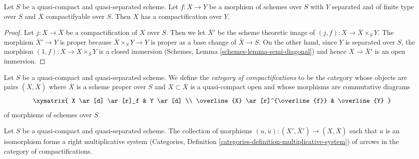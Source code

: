 \begin{lemma}
\label{lemma-compactifyable}
Let $S$ be a quasi-compact and quasi-separated scheme. Let $f : X \to Y$
be a morphism of schemes over $S$ with $Y$ separated and of finite type
over $S$ and $X$ compactifyable over $S$. Then $X$ has a compactification
over $Y$.
\end{lemma}

\begin{proof}
Let $j : X \to \overline{X}$ be a compactification of $X$ over $S$.
Then we let $\overline{X}'$ be
the scheme theoretic image of $(j, f) : X \to \overline{X} \times_S Y$.
The morphism $\overline{X}' \to Y$ is proper because
$\overline{X} \times_S Y \to Y$ is proper as a base change of
$\overline{X} \to S$. On the other hand, since $Y$ is separated
over $S$, the morphism $(1, f) : X \to X \times_S Y$ is a closed
immersion (Schemes, Lemma \ref{schemes-lemma-semi-diagonal})
and hence $X \to \overline{X}'$ is an open immersion.
\end{proof}

\noindent
Let $S$ be a quasi-compact and quasi-separated scheme.
We define the {\it category of compactifications} to be the category
whose objects are pairs $(X, \overline{X})$ where $\overline{X}$
is a scheme proper over $S$ and $X \subset \overline{X}$ is a
quasi-compact open and whose morphisms
are commutative diagrams
$$
\xymatrix{
X \ar[d] \ar[r]_f & Y \ar[d] \\
\overline{X} \ar[r]^{\overline{f}} & \overline{Y}
}
$$
of morphisms of schemes over $S$.

\begin{lemma}
\label{lemma-right-multiplicative-system}
Let $S$ be a quasi-compact and quasi-separated scheme.
The collection of morphisms
$(u, \overline{u}) : (X', \overline{X}') \to (X, \overline{X})$
such that $u$ is an isomorphism forms a right multiplicative system
(Categories, Definition \ref{categories-definition-multiplicative-system})
of arrows in the category of compactifications.
\end{lemma}

